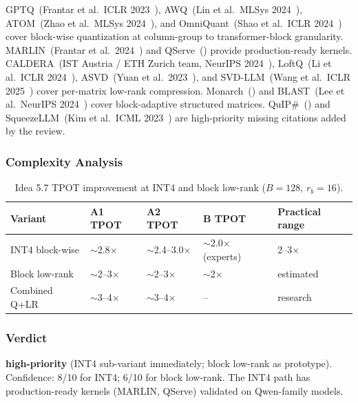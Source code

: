 \documentclass[11pt]{article}
\begin{document}
GPTQ~(Frantar et al.\ ICLR 2023~\cite{FrantarGPTQ2023}), AWQ~(Lin et al.\ MLSys 2024~\cite{LinAWQ2024}), ATOM~(Zhao et al.\ MLSys 2024~\cite{ZhaoATOM2024}), and OmniQuant~(Shao et al.\ ICLR 2024~\cite{ShaoOmniQuant2024}) cover block-wise quantization at column-group to transformer-block granularity. MARLIN~(Frantar et al.\ 2024~\cite{FrantarMARLIN2024}) and QServe~(\cite{LinQServe2024}) provide production-ready kernels. CALDERA~(IST Austria / ETH Zurich team, NeurIPS 2024~\cite{CALDERA2024}), LoftQ~(Li et al.\ ICLR 2024~\cite{LiLoftQ2024}), ASVD~(Yuan et al.\ 2023~\cite{YuanASVD2023}), and SVD-LLM~(Wang et al.\ ICLR 2025~\cite{WangSVDLLM2025}) cover per-matrix low-rank compression. Monarch~(\cite{DaoMonarch2022}) and BLAST~(Lee et al.\ NeurIPS 2024~\cite{LeeBLAST2024}) cover block-adaptive structured matrices. QuIP\#~(\cite{Tseng2024QuIPsharp}) and SqueezeLLM~(Kim et al.\ ICML 2023~\cite{KimSqueezeLLM2023}) are high-priority missing citations added by the review.

\subsubsection*{Complexity Analysis}

\begin{table}[h]
\centering
\caption{Idea 5.7 TPOT improvement at INT4 and block low-rank ($B{=}128$, $r_b{=}16$).}
\small
\begin{tabular}{lllll}
\toprule
Variant & A1 TPOT & A2 TPOT & B TPOT & Practical range \\
\midrule
INT4 block-wise & $\sim$2.8$\times$ & $\sim$2.4--3.0$\times$ & $\sim$2.0$\times$ (experts) & 2--3$\times$ \\
Block low-rank & $\sim$2--3$\times$ & $\sim$2--3$\times$ & $\sim$2$\times$ & estimated \\
Combined Q+LR & $\sim$3--4$\times$ & $\sim$3--4$\times$ & -- & research \\
\bottomrule
\end{tabular}
\end{table}

\subsubsection*{Verdict}

\noindent\textbf{high-priority} (INT4 sub-variant immediately; block low-rank as prototype). Confidence: 8/10 for INT4; 6/10 for block low-rank. The INT4 path has production-ready kernels (MARLIN, QServe) validated on Qwen-family models.
\end{document}
